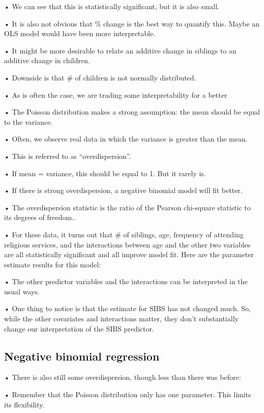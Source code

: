 \documentclass[
  letterpaper,
  DIV=11,
  numbers=noendperiod]{scrreprt}
\begin{document}
• We can see that this is statistically significant, but it is also
small.

• It is also not obvious that \% change is the best way to quantify
this. Maybe an OLS model would have been more interpretable.

• It might be more desirable to relate an additive change in siblings to
an additive change in children.

• Downside is that \# of children is not normally distributed.

• As is often the case, we are trading some interpretability for a
better

• The Poisson distribution makes a strong assumption: the mean should be
equal to the variance.

• Often, we observe real data in which the variance is greater than the
mean.

• This is referred to as ``overdispersion''.

• If mean = variance, this should be equal to 1. But it rarely is.

• If there is strong overdispersion, a negative binomial model will fit
better.

• The overdispersion statistic is the ratio of the Pearson chi-square
statistic to its degrees of freedom..

• For these data, it turns out that \# of siblings, age, frequency of
attending religious services, and the interactions between age and the
other two variables are all statistically significant and all improve
model fit. Here are the parameter estimate results for this model:

• The other predictor variables and the interactions can be interpreted
in the usual ways.

• One thing to notice is that the estimate for SIBS has not changed
much. So, while the other covariates and interactions matter, they don't
substantially change our interpretation of the SIBS predictor.

\hypertarget{negative-binomial-regression}{%
\subsection{Negative binomial
regression}\label{negative-binomial-regression}}

• There is also still some overdispersion, though less than there was
before:

• Remember that the Poisson distribution only has one parameter. This
limits its flexibility.
\end{document}
